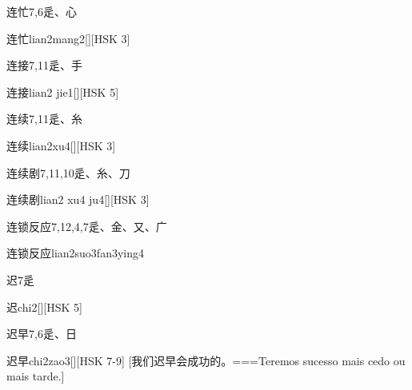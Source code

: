 \begin{Entry}{连忙}{7,6}{⾡、⼼}
  \begin{Phonetics}{连忙}{lian2mang2}[][HSK 3]
  \end{Phonetics}
\end{Entry}

\begin{Entry}{连接}{7,11}{⾡、⼿}
  \begin{Phonetics}{连接}{lian2 jie1}[][HSK 5]
  \end{Phonetics}
\end{Entry}

\begin{Entry}{连续}{7,11}{⾡、⽷}
  \begin{Phonetics}{连续}{lian2xu4}[][HSK 3]
  \end{Phonetics}
\end{Entry}

\begin{Entry}{连续剧}{7,11,10}{⾡、⽷、⼑}
  \begin{Phonetics}{连续剧}{lian2 xu4 ju4}[][HSK 3]
  \end{Phonetics}
\end{Entry}

\begin{Entry}{连锁反应}{7,12,4,7}{⾡、⾦、⼜、⼴}
  \begin{Phonetics}{连锁反应}{lian2suo3fan3ying4}
  \end{Phonetics}
\end{Entry}

\begin{Entry}{迟}{7}{⾡}
  \begin{Phonetics}{迟}{chi2}[][HSK 5]
  \end{Phonetics}
\end{Entry}

\begin{Entry}{迟早}{7,6}{⾡、⽇}
  \begin{Phonetics}{迟早}{chi2zao3}[][HSK 7-9]
    [我们迟早会成功的。===Teremos sucesso mais cedo ou mais tarde.]
  \end{Phonetics}
\end{Entry}

